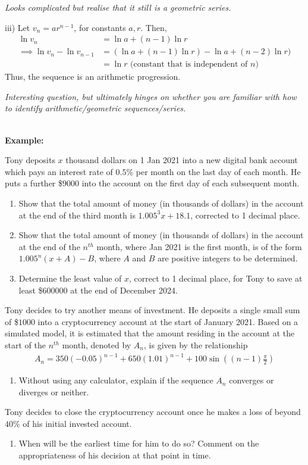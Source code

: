 \documentclass[12pt, a4paper, titlepage]{article}
\begin{document}
\emph{Looks complicated but realise that it still is a geometric series.}

iii)
Let $v_n = ar^{n - 1}$, for constants $a, r$. Then,
\begin{align*}
    \ln v_n &= \ln a + (n - 1) \ln r \\
    \implies \ln v_n - \ln v_{n - 1} &= (\ln a + (n - 1) \ln r) - \ln a + (n - 2) \ln r) \\
    &= \ln r \text{ (constant that is independent of } n \text{)}
\end{align*}
Thus, the sequence is an arithmetic progression.

\emph{Interesting question, but ultimately hinges on whether you are familiar with how to identify arithmetic/geometric sequences/series.}

\textbf{\\ Example:}

Tony deposits $x$ thousand dollars on 1 Jan 2021 into a new digital bank account which pays an interest rate of $0.5\%$ per month on the last day of each month. He puts a further \$$9000$ into the account on the first day of each subsequent month.
\begin{enumerate}[label=(\roman*)]
    \item Show that the total amount of money (in thousands of dollars) in the account at the end of the third month is $1.005^3x + 18.1$, corrected to 1 decimal place.
    \item Show that the total amount of money (in thousands of dollars) in the account at the end of the $n^{th}$ month, where Jan 2021 is the first month, is of the form $1.005^n(x + A) - B$, where $A$ and $B$ are positive integers to be determined.
    \item Determine the least value of $x$, correct to 1 decimal place, for Tony to save at least \$$600000$ at the end of December 2024.
\end{enumerate}
Tony decides to try another means of investment. He deposits a single small sum of \$$1000$ into a cryptocurrency account at the start of January 2021. Based on a simulated model, it is estimated that the amount residing in the account at the start of the $n^{th}$ month, denoted by $A_n$, is given by the relationship
\begin{align*}
    A_n = 350(-0.05)^{n - 1} + 650(1.01)^{n - 1} + 100 \sin ((n - 1)\frac{\pi}{2})
\end{align*}
\begin{enumerate}[resume, label=(\roman*)]
    \item Without using any calculator, explain if the sequence $A_n$ converges or diverges or neither.
\end{enumerate}
Tony decides to close the cryptocurrency account once he makes a loss of beyond $40\%$ of his initial invested account.
\begin{enumerate}[resume, label=(\roman*)]
    \item When will be the earliest time for him to do so? Comment on the appropriateness of his decision at that point in time.
\end{enumerate}
\end{document}
